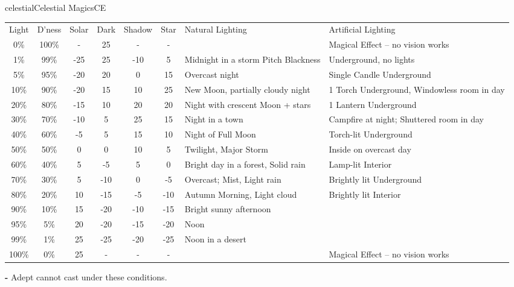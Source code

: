 \begin{college}[1.3]{celestial}{Celestial Magics}{CE}
\begin{table*}
\begin{tabularx}{\linewidth}{ccccccXX}
Light	& D'ness	& Solar	& Dark	& Shadow& Star	& Natural Lighting & Artificial Lighting \\
0\%	& 100\%		& -	& 25	& -	& -	& & Magical Effect -- no vision works \\
1\%	& 99\%		& -25	& 25	& -10	& 5	& Midnight in a storm Pitch Blackness & Underground, no lights \\
5\%	& 95\%		& -20	& 20	& 0	& 15	& Overcast night & Single Candle Underground \\
10\%	& 90\%		& -20	& 15	& 10	& 25	& New Moon, partially cloudy night & 1 Torch Underground, Windowless room in day \\
20\%	& 80\%		& -15	& 10	& 20	& 20	& Night with crescent Moon + stars & 1 Lantern Underground \\
30\%	& 70\%		& -10	& 5	& 25	& 15	& Night in a town & Campfire at night; Shuttered room in day \\
40\%	& 60\%		& -5	& 5	& 15	& 10	& Night of Full Moon & Torch-lit Underground \\
50\%	& 50\%		& 0	& 0	& 10	& 5	& Twilight, Major Storm & Inside on overcast day \\
60\%	& 40\%		& 5	& -5	& 5	& 0	& Bright day in a forest, Solid rain & Lamp-lit Interior \\
70\%	& 30\%		& 5	& -10	& 0	& -5	& Overcast; Mist, Light rain & Brightly lit Underground \\
80\%	& 20\%		& 10	& -15	& -5	& -10	& Autumn Morning, Light cloud & Brightly lit Interior \\
90\%	& 10\%		& 15	& -20	& -10	& -15	& Bright sunny afternoon & \\
95\%	& 5\%		& 20	& -20	& -15	& -20	& Noon & \\
99\%	& 1\%		& 25	& -25	& -20	& -25	& Noon in a desert& \\
100\%	& 0\%		& 25	& -	& -	& - 	& & Magical Effect -- no vision works \\
\end{tabularx}
\textbf{-} Adept cannot cast under these conditions.
\end{table*}

\end{college}
